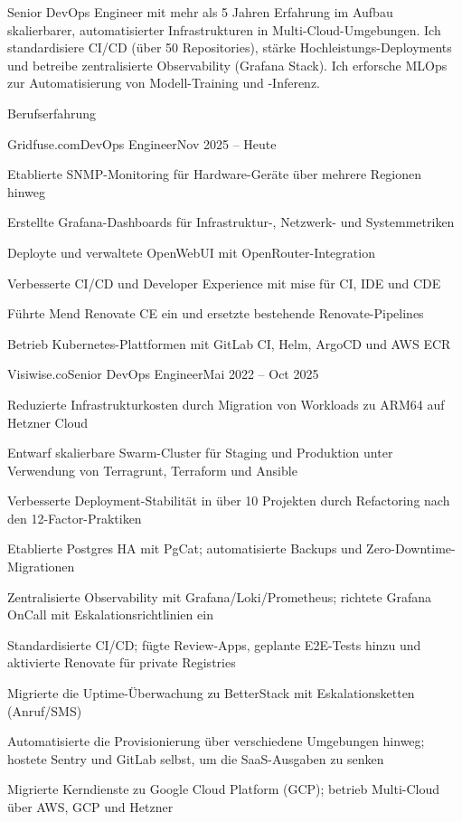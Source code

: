 \documentclass[]{main}
\begin{document}
\resumeheader
{\address{Leipzig, Deutschland}}
{}
{}
{}
{}
{}

Senior DevOps Engineer mit mehr als 5 Jahren Erfahrung im Aufbau skalierbarer, automatisierter Infrastrukturen in Multi-Cloud-Umgebungen. Ich standardisiere CI/CD (über 50 Repositories), stärke Hochleistungs-Deployments und betreibe zentralisierte Observability (Grafana Stack). Ich erforsche MLOps zur Automatisierung von Modell-Training und -Inferenz.

\begin{section}{Berufserfahrung}
  \begin{subsection}{Gridfuse.com}{DevOps Engineer}{Nov 2025 -- Heute}{}
     \item Etablierte SNMP-Monitoring für Hardware-Geräte über mehrere Regionen hinweg
     \item Erstellte Grafana-Dashboards für Infrastruktur-, Netzwerk- und Systemmetriken
     \item Deployte und verwaltete OpenWebUI mit OpenRouter-Integration
     \item Verbesserte CI/CD und Developer Experience mit mise für CI, IDE und CDE
     \item Führte Mend Renovate CE ein und ersetzte bestehende Renovate-Pipelines
     \item Betrieb Kubernetes-Plattformen mit GitLab CI, Helm, ArgoCD und AWS ECR
 \end{subsection}

 \begin{subsection}{Visiwise.co}{Senior DevOps Engineer}{Mai 2022 -- Oct 2025}{}
     \item Reduzierte Infrastrukturkosten durch Migration von Workloads zu ARM64 auf Hetzner Cloud
     \item Entwarf skalierbare Swarm-Cluster für Staging und Produktion unter Verwendung von Terragrunt, Terraform und Ansible
     \item Verbesserte Deployment-Stabilität in über 10 Projekten durch Refactoring nach den 12-Factor-Praktiken
     \item Etablierte Postgres HA mit PgCat; automatisierte Backups und Zero-Downtime-Migrationen
     \item Zentralisierte Observability mit Grafana/Loki/Prometheus; richtete Grafana OnCall mit Eskalationsrichtlinien ein
     \item Standardisierte CI/CD; fügte Review-Apps, geplante E2E-Tests hinzu und aktivierte Renovate für private Registries
     \item Migrierte die Uptime-Überwachung zu BetterStack mit Eskalationsketten (Anruf/SMS)
     \item Automatisierte die Provisionierung über verschiedene Umgebungen hinweg; hostete Sentry und GitLab selbst, um die SaaS-Ausgaben zu senken
     \item Migrierte Kerndienste zu Google Cloud Platform (GCP); betrieb Multi-Cloud über AWS, GCP und Hetzner
 \end{subsection}


\end{section}
\end{document}
